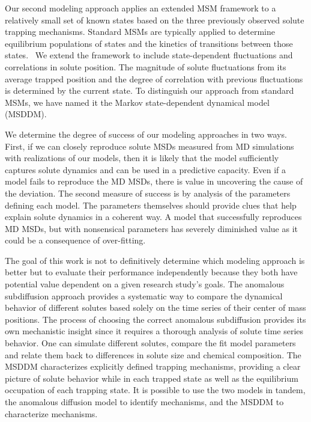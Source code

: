 \documentclass[aps,pre,preprint,groupedaddress]{revtex4-2}
\begin{document}
  Our second modeling approach applies an extended MSM framework to a relatively 
  small set of known states based on the three previously observed solute trapping mechanisms.  
  Standard MSMs are typically applied to determine equilibrium populations
  of states and the kinetics of transitions between those states.~\cite{bowman_using_2009} 
  We extend the framework to include state-dependent fluctuations and correlations in 
  solute position. The magnitude of solute fluctuations from its average trapped 
  position and the degree of correlation with previous fluctuations is 
  determined by the current state. To distinguish our approach from standard MSMs, we have
  named it the Markov state-dependent dynamical model (MSDDM).
  
  We determine the degree of success of our modeling approaches in two ways. First,
  if we can closely reproduce solute MSDs measured from MD simulations with realizations
  of our models, then it is likely that the model sufficiently captures solute 
  dynamics and can be used in a predictive capacity. Even if a model fails to 
  reproduce the MD MSDs, there is value in uncovering the cause of the deviation.
  The second measure of success is by analysis of the parameters defining each 
  model. The parameters themselves should provide clues that help explain solute 
  dynamics in a coherent way. A model that successfully reproduces MD MSDs, but 
  with nonsensical parameters has severely diminished value as it could be a 
  consequence of over-fitting.
  
  The goal of this work is not to definitively determine which modeling approach
  is better but to evaluate their performance independently because they both
  have potential value dependent on a given research study's goals. The anomalous subdiffusion
  approach provides a systematic way to compare the dynamical behavior of different
  solutes based solely on the time series of their center of mass positions. The process
  of choosing the correct anomalous subdiffusion provides its own mechanistic insight
  since it requires a thorough analysis of solute time series behavior. One can simulate
  different solutes, compare the fit model parameters and relate them back to 
  differences in solute size and chemical composition. 
  The MSDDM characterizes 
  explicitly defined trapping mechanisms, providing a clear picture of solute behavior
  while in each trapped state as well as the equilibrium occupation of each trapping state.
  It is possible to use the two models in tandem, the anomalous diffusion model to
  identify mechanisms, and the MSDDM to characterize mechanisms. 
  
\end{document}
